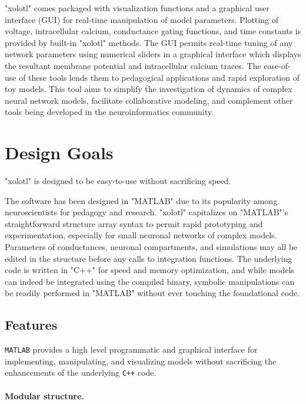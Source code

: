 \documentclass{frontiersSCNS} %
\begin{document}
"xolotl" comes packaged with visualization functions and a graphical user interface (GUI) for real-time manipulation of model parameters. Plotting of voltage, intracellular calcium, conductance gating functions, and time constants is provided by built-in "xolotl" methods. The GUI permits real-time tuning of any network parameters using numerical sliders in a graphical interface which displays the resultant membrane potential and intracellular calcium traces. The ease-of-use of these tools lends them to pedagogical applications and rapid exploration of toy models. This tool aims to simplify the investigation of dynamics of complex neural network models, facilitate collaborative modeling, and complement other tools being developed in the neuroinformatics community.

%
%
%
%
%
%

\section{Design Goals}
\label{design}

"xolotl" is designed to be easy-to-use without sacrificing speed. 

The software has been designed in "MATLAB" due to its popularity among neuroscientists for pedagogy and research. "xolotl" capitalizes on "MATLAB"'s straightforward structure array syntax to permit rapid prototyping and experimentation, especially for small neuronal networks of complex models. Parameters of conductances, neuronal compartments, and simulations may all be edited in the structure before any calls to integration functions. The underlying code is written in "C++" for speed and memory optimization, and while models can indeed be integrated using the compiled binary, symbolic manipulations can be readily performed in "MATLAB" without ever touching the foundational code. 

\subsection{Features}
\label{features}

\texttt{MATLAB} provides a high level programmatic and graphical interface for implementing, manipulating, and visualizing models without sacrificing the enhancements of the underlying \texttt{C++} code.

\paragraph{Modular structure.} 
\end{document}
